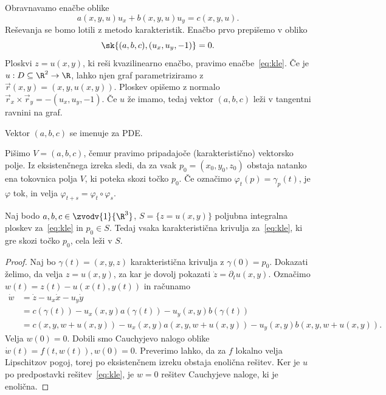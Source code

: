 
Obravnavamo enačbe oblike
\begin{equation}
  \label{eq:kle}
  a(x, y, u) u_x + b(x, y, u) u_y = c(x, y, u).
\end{equation}
Reševanja se bomo lotili z metodo karakteristik.
Enačbo prvo prepišemo v obliko
\[
  \sk{(a, b, c), (u_x, u_y, -1)} = 0.
\]
Ploskvi $z = u(x, y)$, ki reši kvazilinearno enačbo, pravimo  enačbe~\eqref{eq:kle}.
Če je $u: D \subseteq \R^2 \to \R$, lahko njen graf parametriziramo z
$\vec{r}(x, y) = (x, y, u(x, y))$.
Ploskev opišemo z normalo $\vec{r}_x \times \vec{r}_y = -(u_x, u_y, -1)$.
Če $u$ že imamo, tedaj vektor $(a, b, c)$ leži v tangentni ravnini na graf.

\begin{definicija}
  Vektor $(a, b, c)$ se imenuje  za PDE\@.
\end{definicija}

Pišimo $V = (a, b, c)$, čemur pravimo pripadajoče (karakteristično) vektorsko
polje.
Iz eksistenčnega izreka sledi, da za vsak $p_0 = (x_0, y_0, z_0)$ obstaja
natanko ena tokovnica polja $V$, ki poteka skozi točko $p_0$.
Če označimo $\varphi_t(p) = \gamma_p(t)$, je $\varphi$ tok, in velja
$\varphi_{t+s} = \varphi_t \circ \varphi_s$.

\begin{trditev}
  Naj bodo $a,b,c \in \zvodv{1}{\R^3}$, $S = \{z = u(x,y)\}$ poljubna integralna
  ploskev za~\eqref{eq:kle} in $p_0 \in S$.
  Tedaj vsaka karakteristična krivulja za~\eqref{eq:kle}, ki gre skozi točko
  $p_0$, cela leži v $S$.
\end{trditev}

\begin{proof}
  Naj bo $\gamma(t) = (x, y, z)$ karakteristična krivulja z $\gamma(0) = p_0$.
  Dokazati želimo, da velja $z = u(x, y)$, za kar je dovolj pokazati $\dot{z} =
  \partial_t u(x, y)$.
  Označimo $w(t) = z(t) - u(x(t), y(t))$ in računamo
  \begin{align*}
	\dot{w}
	&= \dot{z} - u_x \dot{x} - u_y \dot{y} \\
	&= c(\gamma(t)) - u_x(x, y) a(\gamma(t)) - u_y(x, y) b(\gamma(t)) \\
	&= c(x, y, w+u(x, y)) - u_x(x, y) a(x, y, w+u(x, y)) - u_y(x, y) b(x, y, w+u(x, y)).
  \end{align*}
  Velja $w(0) = 0$.
  Dobili smo Cauchyjevo nalogo oblike $\dot{w}(t) = f(t, w(t)), w(0) = 0$.
  Preverimo lahko, da za $f$ lokalno velja Lipschitzov pogoj, torej po
  eksistenčnem izreku obstaja enolična rešitev.
  Ker je $u$ po predpostavki rešitev~\eqref{eq:kle}, je $w = 0$ rešitev
  Cauchyjeve naloge, ki je enolična.
\end{proof}

